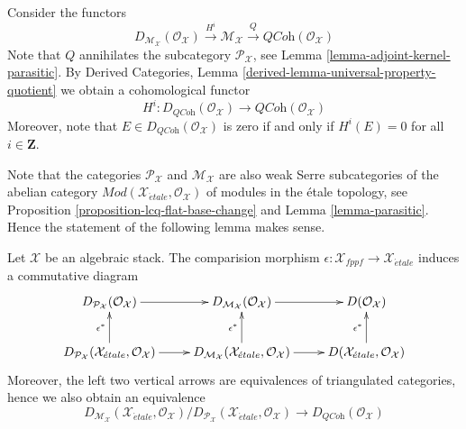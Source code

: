 \medskip\noindent
Consider the functors
$$
D_{\mathcal{M}_\mathcal{X}}(\mathcal{O}_\mathcal{X})
\xrightarrow{H^i}
\mathcal{M}_\mathcal{X}
\xrightarrow{Q}
\textit{QCoh}(\mathcal{O}_\mathcal{X})
$$
Note that $Q$ annihilates the subcategory $\mathcal{P}_\mathcal{X}$, see
Lemma \ref{lemma-adjoint-kernel-parasitic}.
By
Derived Categories, Lemma \ref{derived-lemma-universal-property-quotient}
we obtain a cohomological functor
\begin{equation}
\label{equation-Hi-quasi-coherent}
H^i :
D_{\textit{QCoh}}(\mathcal{O}_\mathcal{X})
\longrightarrow
\textit{QCoh}(\mathcal{O}_\mathcal{X})
\end{equation}
Moreover, note that $E \in D_{\textit{QCoh}}(\mathcal{O}_\mathcal{X})$
is zero if and only if $H^i(E) = 0$ for all $i \in \mathbf{Z}$.

\medskip\noindent
Note that the categories $\mathcal{P}_\mathcal{X}$ and
$\mathcal{M}_\mathcal{X}$ are also weak Serre subcategories of the
abelian category
$\textit{Mod}(\mathcal{X}_{\acute{e}tale}, \mathcal{O}_\mathcal{X})$
of modules in the \'etale topology, see
Proposition \ref{proposition-lcq-flat-base-change} and
Lemma \ref{lemma-parasitic}.
Hence the statement of the following lemma makes sense.

\begin{lemma}
\label{lemma-compare-etale-fppf-QCoh}
Let $\mathcal{X}$ be an algebraic stack. The comparision morphism
$\epsilon : \mathcal{X}_{fppf} \to \mathcal{X}_{\acute{e}tale}$
induces a commutative diagram
$$
\xymatrix{
D_{\mathcal{P}_\mathcal{X}}(\mathcal{O}_\mathcal{X}) \ar[r] &
D_{\mathcal{M}_\mathcal{X}}(\mathcal{O}_\mathcal{X}) \ar[r] &
D(\mathcal{O}_\mathcal{X}) \\
D_{\mathcal{P}_\mathcal{X}}(
\mathcal{X}_{\acute{e}tale}, \mathcal{O}_\mathcal{X})
\ar[r] \ar[u]^{\epsilon^*} &
D_{\mathcal{M}_\mathcal{X}}(
\mathcal{X}_{\acute{e}tale}, \mathcal{O}_\mathcal{X})
\ar[r] \ar[u]^{\epsilon^*} &
D(\mathcal{X}_{\acute{e}tale}, \mathcal{O}_\mathcal{X})
\ar[u]^{\epsilon^*}
}
$$
Moreover, the left two vertical arrows are equivalences of triangulated
categories, hence we also obtain an equivalence
$$
D_{\mathcal{M}_\mathcal{X}}(
\mathcal{X}_{\acute{e}tale}, \mathcal{O}_\mathcal{X})
/
D_{\mathcal{P}_\mathcal{X}}(
\mathcal{X}_{\acute{e}tale}, \mathcal{O}_\mathcal{X})
\longrightarrow
D_{\textit{QCoh}}(\mathcal{O}_\mathcal{X})
$$
\end{lemma}

